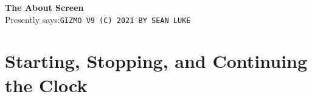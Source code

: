 \documentclass{article}
\begin{document}
\begin{description}
		
	\item{\bf The About Screen}\\
		Presently says:\quad \texttt{GIZMO V9 (C) 2021 BY SEAN LUKE}
	\end{description}

\clearpage



\section{Starting, Stopping, and Continuing the Clock }
	\label{startingclock}
\end{document}
